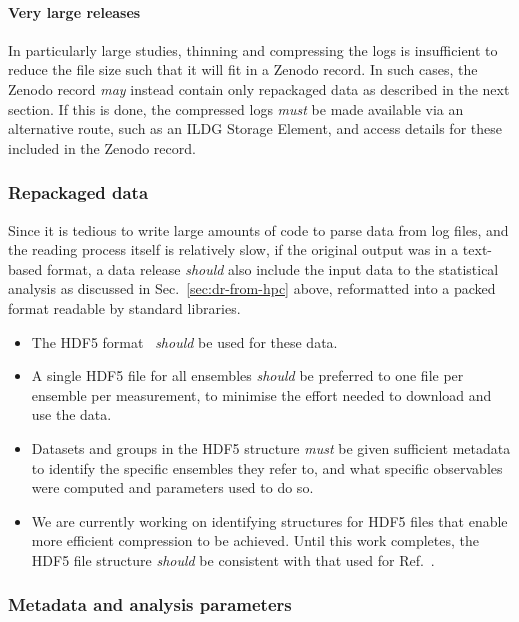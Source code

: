 \documentclass{article}
\newcommand\rfcword[1]{\emph{#1}\xspace}
\newcommand\must{\rfcword{must}}
\newcommand\should{\rfcword{should}}
\newcommand\may{\rfcword{may}}
\begin{document}
\paragraph{Very large releases}

In particularly large studies,
thinning and compressing the logs is insufficient to reduce the file size
such that it will fit in a Zenodo record.
In such cases,
the Zenodo record \may instead contain only repackaged data
as described in the next section.
If this is done,
the compressed logs \must be made available via an alternative route,
such as an ILDG Storage Element,
and access details for these included in the Zenodo record.

\subsubsection{Repackaged data}

Since it is tedious to write large amounts of code to parse data from log files,
and the reading process itself is relatively slow,
if the original output was in a text-based format,
a data release \should also include the input data to the statistical analysis
as discussed in Sec.~\ref{sec:dr-from-hpc} above,
reformatted into a packed format readable by standard libraries.

\begin{itemize}
  \item
        The HDF5 format~\cite{hdf5} \should be used for these data.
  \item
        A single HDF5 file for all ensembles \should be preferred
        to one file per ensemble per measurement,
        to minimise the effort needed to download and use the data.
  \item
        Datasets and groups in the HDF5 structure \must be given
        sufficient metadata to identify the specific ensembles they refer to,
        and what specific observables were computed and parameters used to do so.
  \item
        We are currently working on identifying
        structures for HDF5 files that enable more efficient compression to be achieved.
        Until this work completes,
        the HDF5 file structure \should be consistent with
        that used for Ref.~\cite{bennett_2024_13819562}.
\end{itemize}


\subsubsection{Metadata and analysis parameters}
\end{document}

